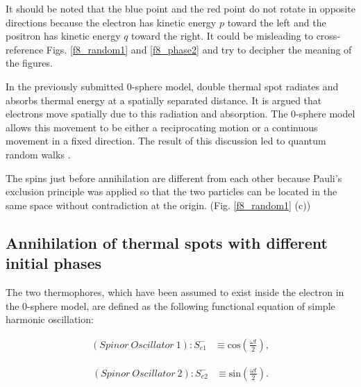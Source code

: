\documentclass[%
 reprint,
 amsmath,amssymb,
 aps,
]{revtex4-1}
\numberwithin{equation}{section}%
\begin{document}
It should be noted that the blue point and the red point do not rotate in opposite directions because the electron has kinetic energy $p$ toward the left and the positron has kinetic energy $q$ toward the right. It could be misleading to cross-reference Figs. \ref{f8_random1} and \ref{f8_phase2} and try to decipher the meaning of the figures.


In the previously submitted 0-sphere model, double thermal spot radiates and absorbs thermal energy at a spatially separated distance. It is argued that electrons move spatially due to this radiation and absorption. The 0-sphere model allows this movement to be either a reciprocating motion or a continuous movement in a fixed direction. The result of this discussion led to quantum random walks \cite{Hanamura4} \cite{J.Kempe}.


The spins just before annihilation are different from each other because Pauli's exclusion principle was applied so that the two particles can be located in the same space without contradiction at the origin. (Fig. \ref{f8_random1} (c))


\subsection{Annihilation of thermal spots with different initial phases}
\label{Annihilation of thermal spots with different initial phases}


The two thermophores, which have been assumed to exist inside the electron in the 0-sphere model, are defined as the following functional equation of simple harmonic oscillation:


        \begin{equation}
            \begin{split}
                (Spinor \ Oscillator \ 1): S_{e1}^{-} 
                    & \equiv \mathrm{cos} \left( \frac{\omega t}{2} \right)
                    ,
                \label{e3_def_osc_1}
            \end{split}
        \end{equation}

        \begin{equation}
            \begin{split}
                (Spinor \ Oscillator \ 2): S_{e2}^{-}
                    & \equiv \mathrm{sin} \left( \frac{\omega t}{2} \right)
                    .
                \label{e3_def_osc_2}
            \end{split}
        \end{equation}
\end{document}
